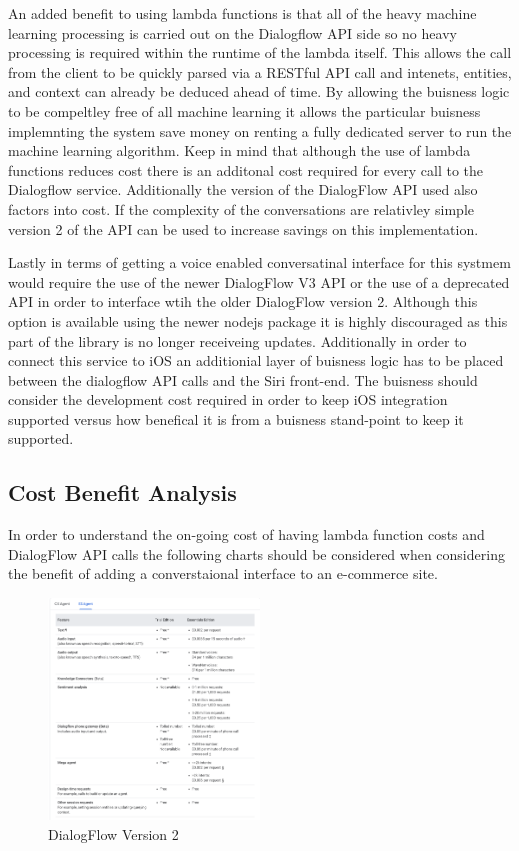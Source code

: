 \documentclass[9pt,software]{livecoms}
\begin{document}
An added benefit to using lambda functions is that all of the heavy machine learning processing is carried out on the Dialogflow API side so no heavy
processing is required within the runtime of the lambda itself. This allows the call from the client to be quickly parsed via a RESTful API call and 
intenets, entities, and context can already be deduced ahead of time. By allowing the buisness logic to be compeltley free of all machine learning it allows
the particular buisness implemnting the system save money on renting a fully dedicated server to run the machine learning algorithm. Keep in mind that although
the use of lambda functions reduces cost there is an additonal cost required for every call to the Dialogflow service. Additionally the version of the DialogFlow API 
used also factors into cost. If the complexity of the conversations are relativley simple version 2 of the API can be used to increase savings on this implementation.

Lastly in terms of getting a voice enabled conversatinal interface for this systmem would require the use of the newer DialogFlow V3 API or the use of a deprecated 
API in order to interface wtih the older DialogFlow version 2. Although this option is available using the newer nodejs package it is highly discouraged as this part
of the library is no longer receiveing updates. Additionally in order to connect this service to iOS an additionial layer of buisness logic has to be placed between the 
dialogflow API calls and the Siri front-end. The buisness should consider the development cost required in order to keep iOS integration supported versus how 
benefical it is from a buisness stand-point to keep it supported. 

\subsection{Cost Benefit Analysis}
In order to understand the on-going cost of having lambda function costs and DialogFlow API calls the following charts should be considered when 
considering the benefit of adding a converstaional interface to an e-commerce site. 

\begin{figure}
  \caption{DialogFlow Version 2}
  \centering
    \includegraphics[width=0.5\textwidth]{ESAgent.PNG}
\end{figure}
\end{document}
